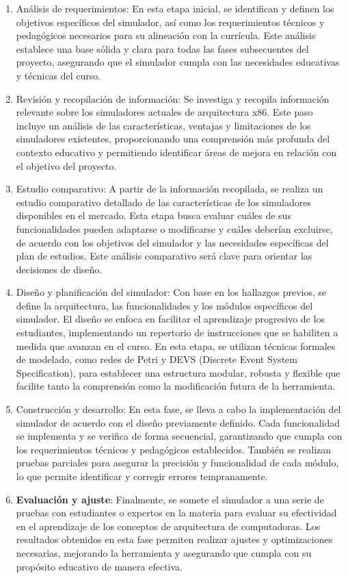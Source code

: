 \documentclass[12pt,oneside]{templates/unerthesis}
\begin{document}
\begin{enumerate}
\def\labelenumi{\arabic{enumi}.}
\item
  Análisis de requerimientos: En esta etapa inicial, se identifican y definen los objetivos específicos del simulador, así como los requerimientos técnicos y pedagógicos necesarios para su alineación con la currícula. Este análisis establece una base sólida y clara para todas las fases subsecuentes del proyecto, asegurando que el simulador cumpla con las necesidades educativas y técnicas del curso.
\item
  Revisión y recopilación de información: Se investiga y recopila información relevante sobre los simuladores actuales de arquitectura x86. Este paso incluye un análisis de las características, ventajas y limitaciones de los simuladores existentes, proporcionando una comprensión más profunda del contexto educativo y permitiendo identificar áreas de mejora en relación con el objetivo del proyecto.
\item
  Estudio comparativo: A partir de la información recopilada, se realiza un estudio comparativo detallado de las características de los simuladores disponibles en el mercado. Esta etapa busca evaluar cuáles de sus funcionalidades pueden adaptarse o modificarse y cuáles deberían excluirse, de acuerdo con los objetivos del simulador y las necesidades específicas del plan de estudios. Este análisis comparativo será clave para orientar las decisiones de diseño.
\item
  Diseño y planificación del simulador: Con base en los hallazgos previos, se define la arquitectura, las funcionalidades y los módulos específicos del simulador. El diseño se enfoca en facilitar el aprendizaje progresivo de los estudiantes, implementando un repertorio de instrucciones que se habiliten a medida que avanzan en el curso. En esta etapa, se utilizan técnicas formales de modelado, como redes de Petri y DEVS (Discrete Event System Specification), para establecer una estructura modular, robusta y flexible que facilite tanto la comprensión como la modificación futura de la herramienta.
\item
  Construcción y desarrollo: En esta fase, se lleva a cabo la implementación del simulador de acuerdo con el diseño previamente definido. Cada funcionalidad se implementa y se verifica de forma secuencial, garantizando que cumpla con los requerimientos técnicos y pedagógicos establecidos. También se realizan pruebas parciales para asegurar la precisión y funcionalidad de cada módulo, lo que permite identificar y corregir errores tempranamente.
\item
  \textbf{Evaluación y ajuste}: Finalmente, se somete el simulador a una serie de pruebas con estudiantes o expertos en la materia para evaluar su efectividad en el aprendizaje de los conceptos de arquitectura de computadoras. Los resultados obtenidos en esta fase permiten realizar ajustes y optimizaciones necesarias, mejorando la herramienta y asegurando que cumpla con su propósito educativo de manera efectiva.
\end{enumerate}
\end{document}
